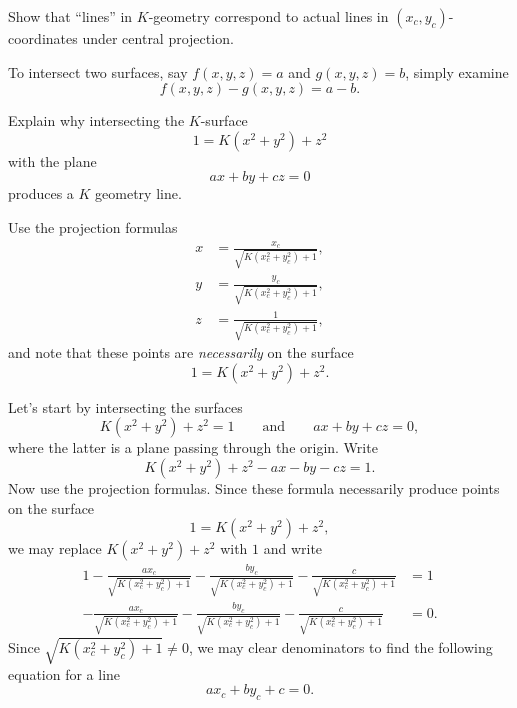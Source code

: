 \documentclass{ximera}
\begin{document}
\begin{problem}
  Show that ``lines'' in $K$-geometry correspond to actual lines in
  $(x_{c},y_{c})$-coordinates under central projection.

\begin{hint}
  To intersect two surfaces, say $f(x,y,z)=a$ and $g(x,y,z)=b$,
  simply examine
  \[
  f(x,y,z)-g(x,y,z) = a-b.
  \]
\end{hint}

\begin{hint}
  Explain why intersecting the $K$-surface
  \[
  1 = K\left(x^2+y^2\right) + z^2 
  \]
  with the plane
  \[
  ax+by+cz = 0
  \]
  produces a $K$ geometry line.
\end{hint}

\begin{hint}
  Use the projection formulas
  \begin{align*}
      x &= \frac{x_c}{\sqrt{K\left(x_c^2 + y_c^2\right)+1}},\\
      y &= \frac{y_c}{\sqrt{K\left(x_c^2 + y_c^2\right)+1}},\\
      z &= \frac{1}{\sqrt{K\left(x_c^2 + y_c^2\right)+1}},
  \end{align*}
  and note that these points are \textit{necessarily} on the surface
  \[
  1 = K\left(x^2+y^2\right) + z^2.
  \]
\end{hint}

\begin{freeResponse}
  Let's start by intersecting the surfaces
  \[
  K\left(x^2+y^2\right)+z^2=1\qquad\text{and}\qquad ax+by+cz=0,
  \]
  where the latter is a plane passing through the origin. Write
  \[
  K\left(x^2+y^2\right) + z^2- ax- by-cz=1.
  \]
  Now use the projection formulas. Since these formula necessarily
  produce points on the surface
  \[
  1 = K\left(x^2+y^2\right) + z^2,
  \]
  we may replace $K\left(x^2+y^2\right) + z^2$ with $1$ and write
  \begin{align*}
    1-\frac{ax_c}{\sqrt{K\left(x_c^2 + y_c^2\right)+1}}- \frac{by_c}{\sqrt{K\left(x_c^2 + y_c^2\right)+1}}-\frac{c}{\sqrt{K\left(x_c^2 + y_c^2\right)+1}} &=1\\
    -\frac{ax_c}{\sqrt{K\left(x_c^2 + y_c^2\right)+1}}- \frac{by_c}{\sqrt{K\left(x_c^2 + y_c^2\right)+1}}-\frac{c}{\sqrt{K\left(x_c^2 + y_c^2\right)+1}} &=0.
  \end{align*}
  Since $\sqrt{K\left(x_c^2 + y_c^2\right)+1} \ne 0$, we may clear
  denominators to find the following equation for a line
  \[
  ax_c+by_c+c= 0.
  \]
\end{freeResponse}
\end{problem}
\end{document}
